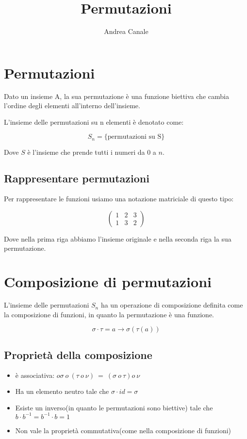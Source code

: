 \documentclass[a4paper, 10pt]{article}
\title{Permutazioni}
\author{Andrea Canale}
\begin{document}
	\maketitle
	\tableofcontents

\section{Permutazioni}

Dato un insieme A, la sua permutazione è una funzione biettiva che cambia l'ordine degli elementi all'interno dell'insieme.

L'insieme delle permutazioni su n elementi è denotato come:

$$S_n=\{\text{permutazioni su S}\}$$

Dove $S$ è l'insieme che prende tutti i numeri da 0 a $n$.

\subsection{Rappresentare permutazioni}

Per rappresentare le funzioni usiamo una notazione matriciale di questo tipo:

$$ \begin{pmatrix}
	1 & 2 & 3 \\
	1 & 3 & 2 
\end{pmatrix}  $$

Dove nella prima riga abbiamo l'insieme originale e nella seconda riga la sua permutazione.

\section{Composizione di permutazioni}

L'insieme delle permutazioni $S_n$ ha un operazione di composizione definita come la composizione di funzioni, in quanto la permutazione è una funzione. 

$$\sigma \cdot \tau = a \rightarrow \sigma(\tau(a))$$

\subsection{Proprietà della composizione}

\begin{itemize}
	\item è associativa: $o	\sigma\ o\ \left(\tau\ o\ \nu\right)\ =\ \left(\sigma\ o\ \tau\right)o\ \nu$
	\item Ha un elemento neutro tale che $\sigma \cdot id = \sigma$
	\item Esiste un inverso(in quanto le permutazioni sono biettive) tale che $b \cdot b^{-1} = b^{-1} \cdot b = 1$
	\item Non vale la proprietà commutativa(come nella composizione di funzioni)
\end{itemize}
\end{document}
